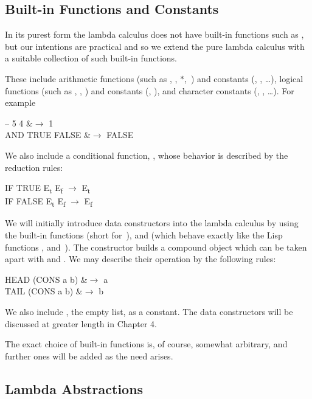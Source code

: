 \subsection{Built-in Functions and Constants}
In its purest form the lambda calculus does not have built-in functions such as
\ml{+}, but our intentions are practical and so we extend the pure lambda calculus
with a suitable collection of such built-in functions.

These include arithmetic functions (such as \ml{+}, \ml{--}, $*$, \ml{/}\,) and constants (, ,
\ldots), logical functions (such as , , ) and constants (,
), and character constants (, , \ldots). For example
\begin{mlalign}
	-- 5 4 &$\to$ 1\\
AND TRUE FALSE &$\to$ FALSE
\end{mlalign}
We also include a conditional function, , whose behavior is described by the
reduction rules:
\begin{mlcoded}
IF TRUE E\textsubscript{t} E\textsubscript{f} $\to$ E\textsubscript{t}\\
IF FALSE E\textsubscript{t} E\textsubscript{f} $\to$ E\textsubscript{f}
\end{mlcoded}

We will initially introduce data constructors into the lambda calculus by
using the built-in functions  (short for \,),  and 
(which behave exactly like the Lisp functions ,  and \,). The
constructor  builds a compound object which can be taken apart with
 and . We may describe their operation by the following rules:
\begin{mlalign}
HEAD (CONS a b) &$\to$ a\\
TAIL (CONS a b) &$\to$ b
\end{mlalign}
We also include , the empty list, as a constant. The data constructors will
be discussed at greater length in Chapter 4.

The exact choice of built-in functions is, of course, somewhat arbitrary, and
further ones will be added as the need arises.

\subsection{Lambda Abstractions}

